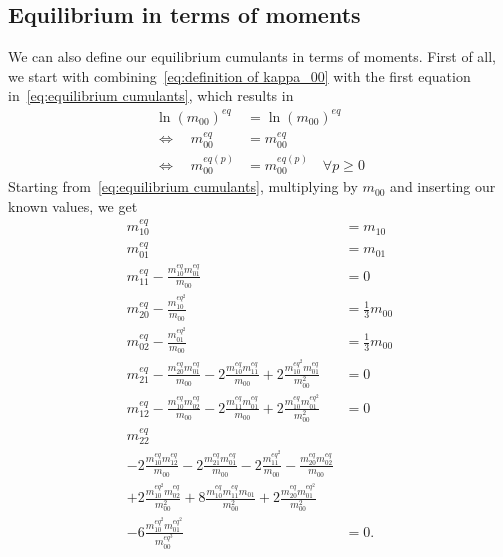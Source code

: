 \subsection{Equilibrium in terms of moments}
\label{sub:Equilibrium in terms of moments}
We can also define our equilibrium cumulants in terms of moments.
First of all, we start with combining~\eqref{eq:definition of kappa_00} with the first equation in~\eqref{eq:equilibrium cumulants}, which results in
\begin{equation}
  \begin{aligned}
    {\ln(m_{00})}^{eq} &= {\ln(m_{00})}^{eq} \\
    \Leftrightarrow\quad m_{00}^{eq} &= m_{00}^{eq} \\
    \Leftrightarrow\quad m_{00}^{eq(p)} &= m_{00}^{eq(p)} \quad\forall p\ge 0
  \end{aligned}
\end{equation}
Starting from~\eqref{eq:equilibrium cumulants}, multiplying by $m_{00}$ and inserting our known values, we get
\begin{equation}
  \begin{aligned}
    m_{10}^{eq} & = m_{10} \\
    m_{01}^{eq} & = m_{01} \\
    m_{11}^{eq} - \frac{m_{10}^{eq}m_{01}^{eq}}{m_{00}} & = 0 \\
    m_{20}^{eq} - \frac{m_{10}^{{eq}^2}}{m_{00}} & = \frac{1}{3} m_{00} \\
    m_{02}^{eq} - \frac{m_{01}^{{eq}^2}}{m_{00}} & = \frac{1}{3} m_{00} \\
    m_{21}^{eq} - \frac{m_{20}^{eq}m_{01}^{eq}}{m_{00}} - 2\frac{m_{10}^{eq}m_{11}^{eq}} {m_{00}} + 2\frac{m_{10}^{{eq}^2} m_{01}^{eq}}{m_{00}^2} & = 0 \\
    m_{12}^{eq} - \frac{m_{10}^{eq}m_{02}^{eq}}{m_{00}}
    - 2\frac{m_{11}^{eq}m_{01}^{eq}}{m_{00}} + 2\frac{m_{10}^{eq} m_{01}^{{eq}^2}}{m_{00}^2} & = 0 \\
    m_{22}^{eq} &\\
    - 2 \frac{m_{10}^{eq}m_{12}^{eq}}{m_{00}} - 2\frac{m_{21}^{eq}m_{01}^{eq}}{m_{00}}
    - 2 \frac{m_{11}^{{eq}^2}}{m_{00}} - \frac{m_{20}^{eq}m_{02}^{eq}}{m_{00}} &\\
    + 2 \frac{m_{10}^{{eq}^2} m_{02}^{eq}}{m_{00}^2} + 8 \frac{m_{10}^{eq}m_{11}^{eq}m_{01}} {m_{00}^2}
    + 2 \frac{m_{20}^{eq}m_{01}^{{eq}^2}}{m_{00}^2} &\\
    - 6 \frac{m_{10}^{{eq}^2} m_{01}^{{eq}^2}}{m_{00}^{{eq}^3}} & = 0.
  \end{aligned}
\end{equation}
